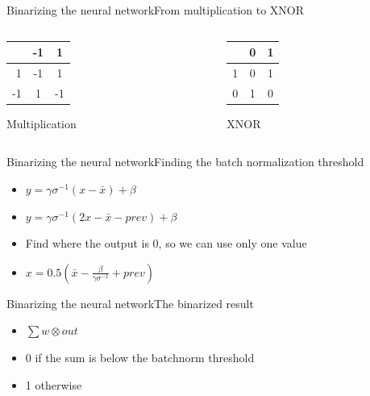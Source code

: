 \documentclass[10pt]{beamer}
\begin{document}
\begin{frame}{Binarizing the neural network}{From multiplication to XNOR}
	\begin{columns}[T] %
		\begin{column}{.48\textwidth}

			\begin{tabular}{r|c|c|}
				  & -1 & 1 \\ \hline
				1 & -1 & 1 \\ \hline
			   -1 &  1 & -1 \\
				\hline
			\end{tabular}

			Multiplication
		\end{column}%
		\hfill%
		\begin{column}{.48\textwidth}
			\begin{tabular}{r|c|c|}
				  & 0 & 1 \\ \hline
				1 & 0 & 1 \\ \hline
			    0 & 1 & 0 \\ \hline
			\end{tabular}

			XNOR
		\end{column}%
	\end{columns}
\end{frame}

\begin{frame}{Binarizing the neural network}{Finding the batch normalization threshold}
\begin{itemize}
	\item $y = \gamma \sigma^{-1}(x-\bar{x})+\beta$
	\item $y = \gamma \sigma^{-1}(2x-\bar{x}-prev)+\beta$
	\item Find where the output is 0, so we can use only one value
	\item $x = 0.5(\bar{x}-\frac{\beta}{\gamma \sigma^{-1}}+prev) $
\end{itemize}
\end{frame}

\begin{frame}{Binarizing the neural network}{The binarized result}
\begin{itemize}
	\item $\sum w \otimes out$
	\item 0 if the sum is below the batchnorm threshold
	\item 1 otherwise
\end{itemize}
\end{frame}
\end{document}
